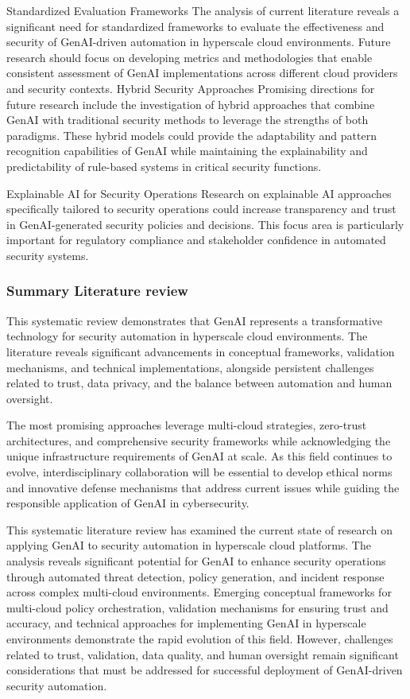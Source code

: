 Standardized Evaluation Frameworks
The analysis of current literature reveals a significant need for standardized frameworks to evaluate the effectiveness and security of GenAI-driven automation in hyperscale cloud environments. Future research should focus on developing metrics and methodologies that enable consistent assessment of GenAI implementations across different cloud providers and security contexts.
Hybrid Security Approaches
Promising directions for future research include the investigation of hybrid approaches that combine GenAI with traditional security methods to leverage the strengths of both paradigms. These hybrid models could provide the adaptability and pattern recognition capabilities of GenAI while maintaining the explainability and predictability of rule-based systems in critical security functions.

Explainable AI for Security Operations
Research on explainable AI approaches specifically tailored to security operations could increase transparency and trust in GenAI-generated security policies and decisions. This focus area is particularly important for regulatory compliance and stakeholder confidence in automated security systems.

\subsubsection{Summary Literature review} %
\label{sec:Summary Literature review}

This systematic review demonstrates that GenAI represents a transformative technology for security automation in hyperscale cloud environments. The literature reveals significant advancements in conceptual frameworks, validation mechanisms, and technical implementations, alongside persistent challenges related to trust, data privacy, and the balance between automation and human oversight.

The most promising approaches leverage multi-cloud strategies, zero-trust architectures, and comprehensive security frameworks while acknowledging the unique infrastructure requirements of GenAI at scale. As this field continues to evolve, interdisciplinary collaboration will be essential to develop ethical norms and innovative defense mechanisms that address current issues while guiding the responsible application of GenAI in cybersecurity.

This systematic literature review has examined the current state of research on applying GenAI to security automation in hyperscale cloud platforms. The analysis reveals significant potential for GenAI to enhance security operations through automated threat detection, policy generation, and incident response across complex multi-cloud environments.
Emerging conceptual frameworks for multi-cloud policy orchestration, validation mechanisms for ensuring trust and accuracy, and technical approaches for implementing GenAI in hyperscale environments demonstrate the rapid evolution of this field. However, challenges related to trust, validation, data quality, and human oversight remain significant considerations that must be addressed for successful deployment of GenAI-driven security automation.




